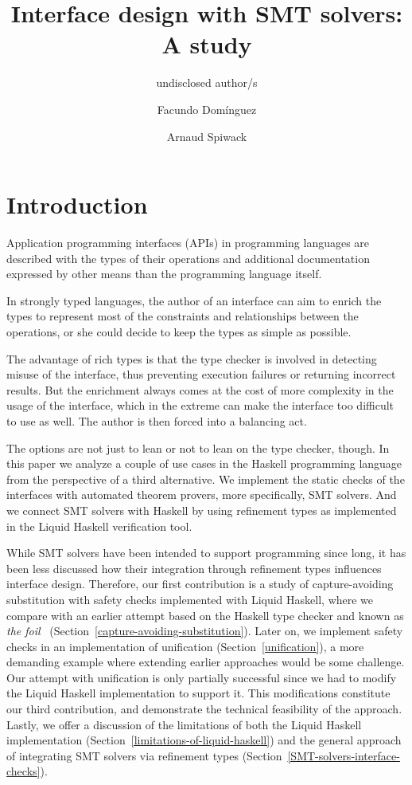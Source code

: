 \documentclass[acmtog, anonymous]{acmart}
\title{Interface design with SMT solvers: A study}
\author{undisclosed author/s}
\author{Facundo Domínguez}
\affiliation{
     \institution{Tweag}
     \country{Uruguay}
}
\author{Arnaud Spiwack}
\affiliation{
     \institution{Tweag}
     \country{Japan}
}
\begin{document}
\maketitle

\section{Introduction}

Application programming interfaces (APIs) in programming languages are described
with the types of their operations and additional documentation expressed by
other means than the programming language itself.

In strongly typed languages, the author of an interface can aim to enrich the
types to represent most of the constraints and relationships between the
operations, or she could decide to keep the types as simple as possible.

The advantage of rich types is that the type checker is involved in detecting
misuse of the interface, thus preventing execution failures or returning
incorrect results. But the enrichment always comes at the cost of more
complexity in the usage of the interface, which in the extreme can make the
interface too difficult to use as well. The author is then forced into a
balancing act.

The options are not just to lean or not to lean on the type checker, though. In
this paper we analyze a couple of use cases in the Haskell programming language
from the perspective of a third alternative. We implement the static checks of
the interfaces with automated theorem provers, more specifically, SMT solvers.
And we connect SMT solvers with Haskell by using refinement types as implemented
in the Liquid Haskell verification tool.

While SMT solvers have been intended to support programming since long, it has
been less discussed how their integration through refinement types influences
interface design. Therefore, our first contribution is a study of
capture-avoiding substitution with safety checks implemented with Liquid Haskell,
where we compare with an earlier attempt based on the Haskell type checker and known as
\textit{the foil}~\cite{maclaurin2022foil}
(Section~\ref{capture-avoiding-substitution}). Later on, we implement safety checks
in an implementation of unification (Section~\ref{unification}), a more demanding
example where extending earlier approaches would be some challenge. Our
attempt with unification is only partially successful since we had to
modify the Liquid Haskell implementation to support it. This modifications
constitute our third contribution, and demonstrate the technical feasibility
of the approach. Lastly, we offer a discussion
of the limitations of both the Liquid Haskell implementation (Section~\ref{limitations-of-liquid-haskell}) and the
general approach of integrating SMT solvers via refinement
types (Section~\ref{SMT-solvers-interface-checks}).
\end{document}
